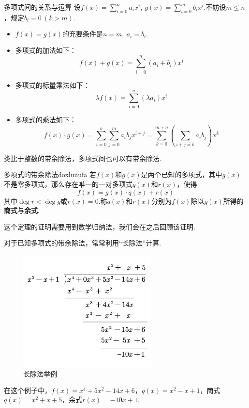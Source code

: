\documentclass[lang=cn, zihao=5]{elegantbook}
\newcommand{\ssb}[1]{\left( #1 \right)}
\begin{document}
\begin{theorem}{多项式间的关系与运算}
	设$f(x) = \sum_{i=0}^{n}a_i x^i,~g(x) = \sum_{i=0}^{m}b_i x^i$.不妨设$m \leq n$，规定$b_i=0~(k > m)$.
	\begin{itemize}
		\item $f(x)=g(x)$的充要条件是$n=m,~a_i=b_i$.
		\item 多项式的加法如下：$$f(x) + g(x) = \sum_{i=0}^{n} (a_i + b_i)x^{i}$$
		\item 多项式的标量乘法如下：$$\lambda f(x) = \sum_{i=0}^{n} (\lambda a_i)x^{i}$$
		\item 多项式的乘法如下：$$f(x) \cdot g(x) = \sum_{i=0}^{n} \sum_{j=0}^{m} a_ib_j x^{i+j} = \sum_{k=0}^{m+n} \ssb{\sum_{i+j=k}a_ib_j}x^k$$
	\end{itemize}
\end{theorem}

类比于整数的带余除法，多项式间也可以有带余除法.

\begin{theorem}{多项式的带余除法}{doxluiiufa}
	若$f(x)$和$g(x)$是两个已知的多项式，其中$g(x)$不是零多项式，那么存在唯一的一对多项式$q(x)$和$r(x)$，使得$$f(x) = g(x) \cdot q(x) + r(x)$$其中$\deg r < \deg g$或$r(x)=0$.称$q(x)$和$r(x)$分别为$f(x)$除以$g(x)$所得的\textbf{商式}与\textbf{余式}.
\end{theorem}
\begin{remark}
	这个定理的证明需要用到数学归纳法，我们会在之后回顾该证明.
\end{remark}

对于已知多项式的带余除法，常常利用“长除法”计算.

\begin{figure}[H]
	\centering
	\includegraphics[width=7cm]{attachment/202304151doxlui.pdf}
	\caption{长除法举例}
\end{figure}

在这个例子中，$f(x)=x^4+5x^2-14x+6$，$g(x)=x^2-x+1$，商式$q(x)=x^2+x+5$，余式$r(x)=-10x+1$.
\end{document}

